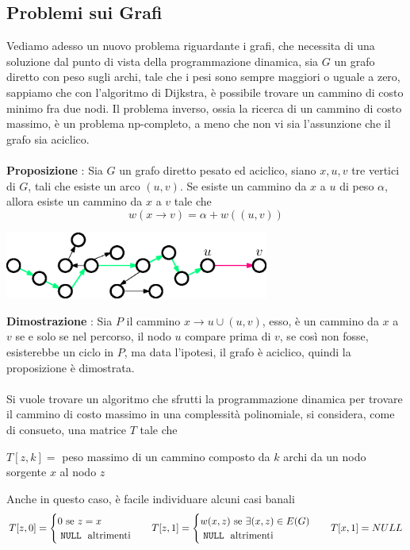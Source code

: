 \documentclass[12pt, letterpaper]{article}
\newcommand{\codee}[1]{\colorbox{white}{\texttt{#1}}}
\newcommand{\acc}{\\\hphantom{}\\}
\begin{document}
\subsection{Problemi sui Grafi}\label{dinamicaGrafi}
Vediamo adesso un nuovo problema riguardante i grafi, che necessita di una soluzione dal punto di vista della programmazione
dinamica, sia $G$ un grafo diretto con peso sugli archi, tale che i pesi sono sempre maggiori o uguale a zero, sappiamo che
con l'algoritmo di Dijkstra, è possibile trovare un cammino di costo minimo fra due nodi. Il problema inverso, ossia la ricerca
di un cammino di costo massimo, è un problema np-completo, a meno che non vi sia l'assunzione che il grafo sia aciclico.\acc
\textbf{Proposizione} : Sia $G$ un grafo diretto pesato ed aciclico, siano $x,u,v$ tre vertici di $G$, tali che esiste
un arco $(u,v)$. Se esiste un cammino da $x$ a $u$ di peso $\alpha$, allora esiste un cammino da $x$ a $v$ tale che
$$ w(x\rightarrow v)=\alpha + w((u,v))$$ \begin{center}
    \includegraphics[width=0.65\textwidth ]{images/cammCostoMax.eps}
\end{center}
\textbf{Dimostrazione} : Sia $P$ il cammino $x\rightarrow u \cup (u,v)$, esso, è un cammino da $x$ a $v$ se e solo
se nel percorso, il nodo $u$ compare prima di $v$, se così non fosse, esisterebbe un ciclo in $P$, ma data l'ipotesi,
il grafo è aciclico, quindi la proposizione è dimostrata.\acc
Si vuole trovare un algoritmo che sfrutti la programmazione dinamica per trovare il cammino di costo massimo in una complessità
polinomiale, si considera, come di consueto, una matrice $T$ tale che\begin{center}
    $T[z,k]=$ peso massimo di un cammino composto da $k$ archi da un nodo sorgente $x$ al nodo $z$
\end{center}
Anche in questo caso, è facile individuare alcuni casi banali
$$ T[z,0]=\begin{cases}
        0\text{ se }z=x \\
        \text{\codee{NULL} altrimenti}
    \end{cases}\;\;\;T[z,1]=\begin{cases}
        w(x,z)\text{ se }\exists (x,z)\in E(G) \\
        \text{\codee{NULL} altrimenti}
    \end{cases}\;\;\;T[x,1]=NULL$$
\end{document}
